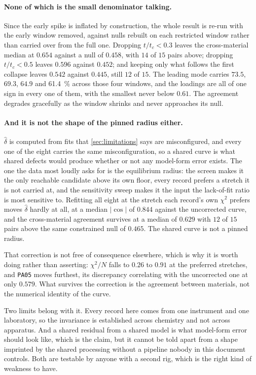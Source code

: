 \documentclass[10pt]{article}
\begin{document}
\paragraph{None of which is the small denominator talking.} Since the early spike is inflated by
construction, the whole result is re-run with the early window removed, against nulls rebuilt on
each restricted window rather than carried over from the full one. Dropping $t/t_c < 0.3$ leaves
the cross-material median at $0.654$ against a null of $0.458$, with $14$ of $15$ pairs above;
dropping $t/t_c < 0.5$ leaves $0.596$ against $0.452$; and keeping only what follows the first
collapse leaves $0.542$ against $0.445$, still $12$ of $15$. The leading mode carries $73.5$,
$69.3$, $64.9$ and \SI{61.4}{\percent} across those four windows, and the loadings are all of
one sign in every one of them, with the smallest never below $0.61$. The agreement degrades
gracefully as the window shrinks and never approaches its null.

\paragraph{And it is not the shape of the pinned radius either.} $\hat\delta$ is computed from
fits that \cref{sec:limitations} says are misconfigured, and every one of the eight carries the
same misconfiguration, so a shared curve is what shared defects would produce whether or not any
model-form error exists. The one the data most loudly asks for is the equilibrium radius: the
screen makes it the only reachable candidate above its own floor, every record prefers a stretch
it is not carried at, and the sensitivity sweep makes it the input the lack-of-fit ratio is most
sensitive to. Refitting all eight at the stretch each record's own $\chi^2$ prefers moves
$\hat\delta$ hardly at all, at a median $\lvert\cos\rvert$ of $0.844$ against the uncorrected
curve, and the cross-material agreement survives at a median of $0.629$ with $12$ of $15$ pairs
above the same constrained null of $0.465$. The shared curve is not a pinned radius.

That correction is not free of consequence elsewhere, which is why it is worth doing rather than
asserting: $\chi^2/N$ falls to $0.26$ to $0.91$ at the preferred stretches, and \texttt{PA05}
moves furthest, its discrepancy correlating with the uncorrected one at only $0.579$. What
survives the correction is the agreement between materials, not the numerical identity of the
curve.

Two limits belong with it. Every record here comes from one instrument and one laboratory, so
the invariance is established across chemistry and not across apparatus. And a shared residual
from a shared model is what model-form error should look like, which is the claim, but it cannot
be told apart from a shape imprinted by the shared processing without a pipeline nobody in this
document controls. Both are testable by anyone with a second rig, which is the right kind of weakness to have.
\end{document}
